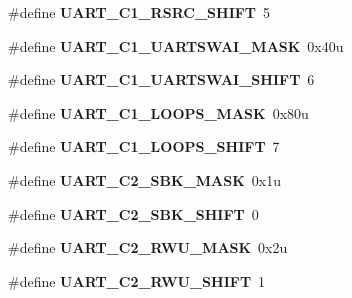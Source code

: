 \begin{DoxyCompactItemize}
\item 
\#define {\bfseries U\+A\+R\+T\+\_\+\+C1\+\_\+\+R\+S\+R\+C\+\_\+\+S\+H\+I\+FT}~5\hypertarget{group__UART__Register__Masks_gac773b486d570b26d17a7d522016f683a}{}\label{group__UART__Register__Masks_gac773b486d570b26d17a7d522016f683a}

\item 
\#define {\bfseries U\+A\+R\+T\+\_\+\+C1\+\_\+\+U\+A\+R\+T\+S\+W\+A\+I\+\_\+\+M\+A\+SK}~0x40u\hypertarget{group__UART__Register__Masks_ga466f5bf7b0cd3c3517da3a6c6a9baaac}{}\label{group__UART__Register__Masks_ga466f5bf7b0cd3c3517da3a6c6a9baaac}

\item 
\#define {\bfseries U\+A\+R\+T\+\_\+\+C1\+\_\+\+U\+A\+R\+T\+S\+W\+A\+I\+\_\+\+S\+H\+I\+FT}~6\hypertarget{group__UART__Register__Masks_gac7888d995fd947613eea08bdee534ffc}{}\label{group__UART__Register__Masks_gac7888d995fd947613eea08bdee534ffc}

\item 
\#define {\bfseries U\+A\+R\+T\+\_\+\+C1\+\_\+\+L\+O\+O\+P\+S\+\_\+\+M\+A\+SK}~0x80u\hypertarget{group__UART__Register__Masks_ga08f1bbd905640d81967f9fb6d4ed8ec8}{}\label{group__UART__Register__Masks_ga08f1bbd905640d81967f9fb6d4ed8ec8}

\item 
\#define {\bfseries U\+A\+R\+T\+\_\+\+C1\+\_\+\+L\+O\+O\+P\+S\+\_\+\+S\+H\+I\+FT}~7\hypertarget{group__UART__Register__Masks_gac6beea8a7bad0b0fc3c3535f629fcf3a}{}\label{group__UART__Register__Masks_gac6beea8a7bad0b0fc3c3535f629fcf3a}

\item 
\#define {\bfseries U\+A\+R\+T\+\_\+\+C2\+\_\+\+S\+B\+K\+\_\+\+M\+A\+SK}~0x1u\hypertarget{group__UART__Register__Masks_ga8d243e5b3a3ece12bdeca818bacb15ee}{}\label{group__UART__Register__Masks_ga8d243e5b3a3ece12bdeca818bacb15ee}

\item 
\#define {\bfseries U\+A\+R\+T\+\_\+\+C2\+\_\+\+S\+B\+K\+\_\+\+S\+H\+I\+FT}~0\hypertarget{group__UART__Register__Masks_ga94f62ff8a45a08ae54b40da725fb245b}{}\label{group__UART__Register__Masks_ga94f62ff8a45a08ae54b40da725fb245b}

\item 
\#define {\bfseries U\+A\+R\+T\+\_\+\+C2\+\_\+\+R\+W\+U\+\_\+\+M\+A\+SK}~0x2u\hypertarget{group__UART__Register__Masks_ga279868a42acca3c1eeba8c53bb94b208}{}\label{group__UART__Register__Masks_ga279868a42acca3c1eeba8c53bb94b208}

\item 
\#define {\bfseries U\+A\+R\+T\+\_\+\+C2\+\_\+\+R\+W\+U\+\_\+\+S\+H\+I\+FT}~1\hypertarget{group__UART__Register__Masks_gaa163993d547a96c2ea002ff52e6b0971}{}\label{group__UART__Register__Masks_gaa163993d547a96c2ea002ff52e6b0971}


\end{DoxyCompactItemize}
